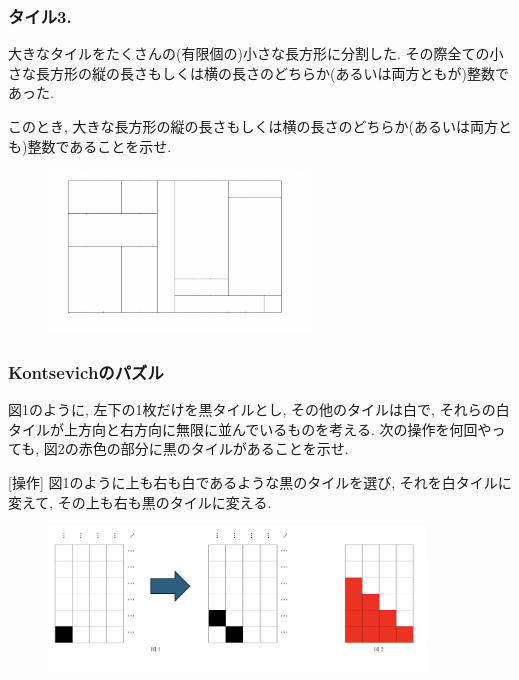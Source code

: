\documentclass[11pt,dvipdfmx]{beamer}
\theoremstyle{definition}
\theoremstyle{remark}
\begin{document}
\begin{frame}
\frametitle{タイル3. }
大きなタイルをたくさんの(有限個の)小さな長方形に分割した. 
その際全ての小さな長方形の縦の長さもしくは横の長さのどちらか(あるいは両方ともが)整数であった.

\vspace{5pt}
このとき, 大きな長方形の縦の長さもしくは横の長さのどちらか(あるいは両方とも)整数であることを示せ.
\begin{figure}[htbp]
\begin{center}
\includegraphics[width=70mm]{tile3.png}
\end{center}
\end{figure}
\end{frame}


\begin{frame}
\frametitle{Kontsevichのパズル}
図1のように, 左下の1枚だけを黒タイルとし, その他のタイルは白で, それらの白タイルが上方向と右方向に無限に並んでいるものを考える.
次の操作を何回やっても, 図2の赤色の部分に黒のタイルがあることを示せ. 

\vspace{5pt}
[操作] 図1のように上も右も白であるような黒のタイルを選び, それを白タイルに変えて, その上も右も黒のタイルに変える.

\begin{figure}[htbp]
\begin{center}
\includegraphics[width=100mm]{kont.png}
\end{center}
\end{figure}
\end{frame}
\end{document}
